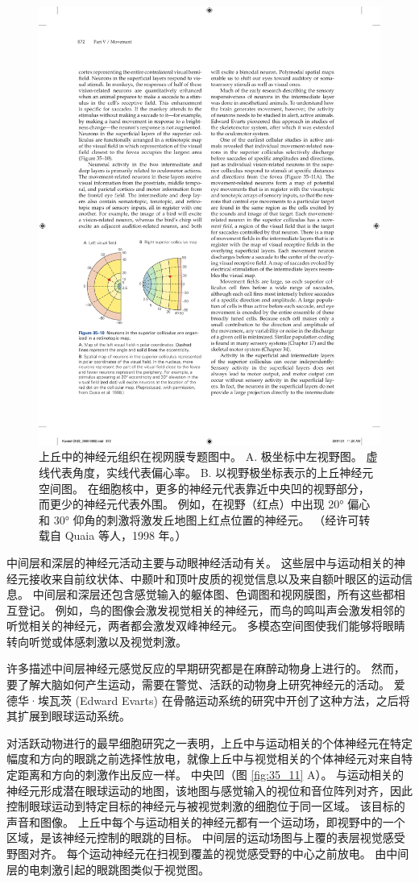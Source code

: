 \begin{figure}[htbp]
	\centering
	\includegraphics[width=0.5\linewidth]{chap35/fig_35_10}
	\caption{上丘中的神经元组织在视网膜专题图中。 A. 极坐标中左视野图。 虚线代表角度，实线代表偏心率。 B. 以视野极坐标表示的上丘神经元空间图。 在细胞核中，更多的神经元代表靠近中央凹的视野部分，而更少的神经元代表外围。 例如，在视野（红点）中出现 20° 偏心和 30° 仰角的刺激将激发丘地图上红点位置的神经元。 （经许可转载自 Quaia 等人，1998 年。）}
	\label{fig:35_10}
\end{figure}


中间层和深层的神经元活动主要与动眼神经活动有关。
这些层中与运动相关的神经元接收来自前纹状体、中颞叶和顶叶皮质的视觉信息以及来自额叶眼区的运动信息。
中间层和深层还包含感觉输入的躯体图、色调图和视网膜图，所有这些都相互登记。
例如，鸟的图像会激发视觉相关的神经元，而鸟的鸣叫声会激发相邻的听觉相关的神经元，两者都会激发双峰神经元。
多模态空间图使我们能够将眼睛转向听觉或体感刺激以及视觉刺激。


许多描述中间层神经元感觉反应的早期研究都是在麻醉动物身上进行的。
然而，要了解大脑如何产生运动，需要在警觉、活跃的动物身上研究神经元的活动。
爱德华·埃瓦茨 (Edward Evarts) 在骨骼运动系统的研究中开创了这种方法，之后将其扩展到眼球运动系统。


对活跃动物进行的最早细胞研究之一表明，上丘中与运动相关的个体神经元在特定幅度和方向的眼跳之前选择性放电，就像上丘中与视觉相关的个体神经元对来自特定距离和方向的刺激作出反应一样。
中央凹（图 \ref{fig:35_11} A）。
与运动相关的神经元形成潜在眼球运动的地图，该地图与感觉输入的视位和音位阵列对齐，因此控制眼球运动到特定目标的神经元与被视觉刺激的细胞位于同一区域。
该目标的声音和图像。
上丘中每个与运动相关的神经元都有一个运动场，即视野中的一个区域，是该神经元控制的眼跳的目标。
中间层的运动场图与上覆的表层视觉感受野图对齐。
每个运动神经元在扫视到覆盖的视觉感受野的中心之前放电。
由中间层的电刺激引起的眼跳图类似于视觉图。


